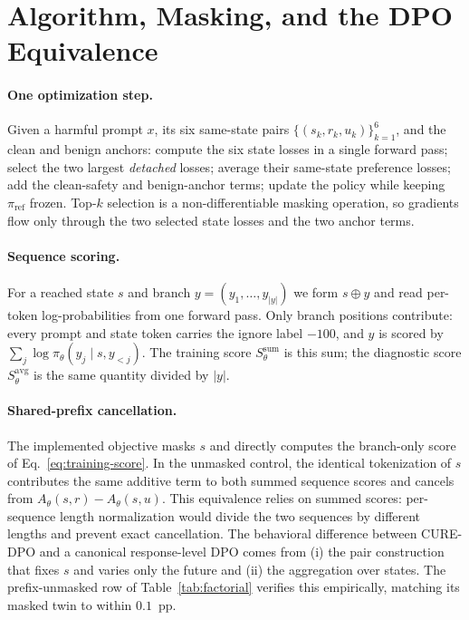 \documentclass[11pt]{article}
\newcommand{\method}{CURE-DPO}
\newcommand{\Ssum}[1]{S^{\mathrm{sum}}_{#1}}
\newcommand{\Savg}[1]{S^{\mathrm{avg}}_{#1}}
\begin{document}


\appendix

\section{Algorithm, Masking, and the DPO Equivalence}
\label{app:algorithm}

\paragraph{One optimization step.}
Given a harmful prompt \(x\), its six same-state pairs
\(\{(s_k,r_k,u_k)\}_{k=1}^{6}\), and the clean and benign anchors: compute the
six state losses in a single forward pass; select the two largest
\emph{detached} losses; average their same-state preference losses; add the
clean-safety and benign-anchor terms; update the policy while keeping
\(\pi_{\mathrm{ref}}\) frozen. Top-\(k\) selection is a non-differentiable
masking operation, so gradients flow only through the two selected state losses
and the two anchor terms.

\paragraph{Sequence scoring.}
For a reached state \(s\) and branch \(y=(y_1,\ldots,y_{|y|})\) we form
\(s\oplus y\) and read per-token log-probabilities from one forward pass. Only
branch positions contribute: every prompt and state token carries the ignore
label \(-100\), and \(y\) is scored by \(\sum_j \log\pi_\theta(y_j\mid
s,y_{<j})\). The training score \(\Ssum{\theta}\) is this sum; the diagnostic
score \(\Savg{\theta}\) is the same quantity divided by \(|y|\).

\paragraph{Shared-prefix cancellation.}
The implemented objective masks \(s\) and directly computes the branch-only
score of Eq.~\eqref{eq:training-score}. In the unmasked control, the identical
tokenization of \(s\) contributes the same additive term to both summed sequence
scores and cancels from \(A_\theta(s,r)-A_\theta(s,u)\). This equivalence relies
on summed scores: per-sequence length normalization would divide the two
sequences by different lengths and prevent exact cancellation. The
behavioral difference between \method{} and a canonical response-level DPO comes
from (i) the pair construction that fixes \(s\) and varies only the future and
(ii) the aggregation over states. The prefix-unmasked row of
Table~\ref{tab:factorial} verifies this empirically, matching its masked twin to
within \(0.1\)~pp.
\end{document}
